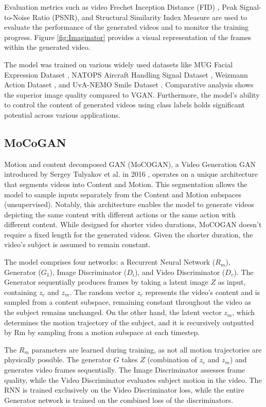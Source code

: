 \documentclass[12pt,twoside,a4paper,parskip]{scrbook} %
\begin{document}
Evaluation metrics such as video Frechet Inception Distance (FID) \cite{fid}, Peak Signal-to-Noise Ratio (PSNR), and Structural Similarity Index Measure are used to evaluate the performance of the generated videos and to monitor the training progress. Figure \ref{fig:Imaginator}  provides a visual representation of the frames within the generated video. 

The model was trained on various widely used datasets like MUG Facial Expression Dataset \cite{13_MUG}, NATOPS Aircraft Handling Signal Dataset \cite{14_aircraft}, Weizmann Action Dataset \cite{15_act_rec}, and UvA-NEMO Smile Dataset \cite{16_face}. Comparative analysis shows the superior image quality compared to VGAN. Furthermore, the model's ability to control the content of generated videos using class labels holds significant potential across various applications.
\subsection{MoCoGAN}
Motion and content decomposed GAN (MoCOGAN), a Video Generation GAN introduced by Sergey Tulyakov et al. in 2016 \cite{10_mocogan}, operates on a unique architecture that segments videos into Content and Motion. This segmentation allows the model to sample inputs separately from the Content and Motion subspaces (unsupervised). Notably, this architecture enables the model to generate videos depicting the same content with different actions or the same action with different content. While designed for shorter video durations, MoCOGAN doesn't require a fixed length for the generated videos. Given the shorter duration, the video's subject is assumed to remain constant.

The model comprises four networks: a Recurrent Neural Network ($R_m$), Generator ($G_1$), Image Discriminator ($D_i$), and Video Discriminator ($D_v$). The Generator sequentially produces frames by taking a latent image $Z$ as input, containing $z_c$ and $z_m$. The random vector $z_c$ represents the video's content and is sampled from a content subspace, remaining constant throughout the video as the subject remains unchanged. On the other hand, the latent vector $z_m$, which determines the motion trajectory of the subject, and it is recursively outputted by Rm by sampling from a motion subspace at each timestep.

The $R_m$ parameters are learned during training, as not all motion trajectories are physically possible. The generator $G$ takes $Z$ (combination of $z_c$ and $z_m$) and generates video frames sequentially. The Image Discriminator assesses frame quality, while the Video Discriminator evaluates subject motion in the video. The RNN is trained exclusively on the Video Discriminator loss, while the entire Generator network is trained on the combined loss of the discriminators.
\end{document}
